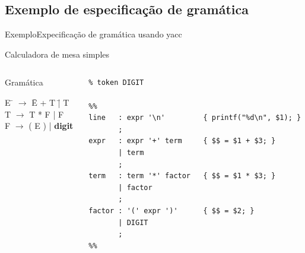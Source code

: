 \subsection{Exemplo de especificação de gramática}

\frame{\tableofcontents[currentsubsection]}

\begin{frame}[fragile]{Exemplo}{Expecificação de gramática usando yacc}

  {\hfil\color{gray} Calculadora de mesa simples}\bigskip

  \begin{columns}
    \begin{column}{.35\textwidth}
      \begin{block}{Gramática}
        \begin{tabbing}
          E \= $\rightarrow$ \= E + T \= | T \\
          T \> $\rightarrow$ \> T * F \> | F\\
          F \> $\rightarrow$ \> ( E ) \> | {\bf digit}\\
        \end{tabbing}
      \end{block}
    \end{column}
    \scriptsize
    \pause
    \begin{column}{.65\textwidth}
      \begin{lstlisting}
% token DIGIT

%%
line   : expr '\n'         { printf("%d\n", $1); }
       ;
expr   : expr '+' term     { $$ = $1 + $3; }
       | term
       ;
term   : term '*' factor   { $$ = $1 * $3; }
       | factor
       ;
factor : '(' expr ')'      { $$ = $2; }
       | DIGIT
       ;
%%
      \end{lstlisting}
    \end{column}
  \end{columns}
\end{frame}


